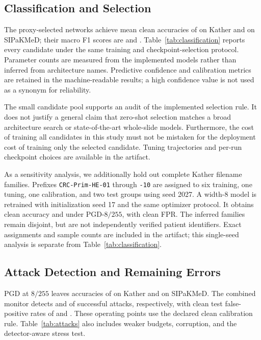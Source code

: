 \documentclass{svproc}
\begin{document}
\subsection{Classification and Selection}

The proxy-selected networks achieve mean clean accuracies of \KAcc{} on Kather and \SAcc{} on SIPaKMeD; their macro F1 scores are \KFone{} and \SFone{}. Table~\ref{tab:classification} reports every candidate under the same training and checkpoint-selection protocol. Parameter counts are measured from the implemented models rather than inferred from architecture names. Predictive confidence and calibration metrics are retained in the machine-readable results; a high confidence value is not used as a synonym for reliability.

The small candidate pool supports an audit of the implemented selection rule. It does not justify a general claim that zero-shot selection matches a broad architecture search or state-of-the-art whole-slide models. Furthermore, the cost of training all candidates in this study must not be mistaken for the deployment cost of training only the selected candidate. Tuning trajectories and per-run checkpoint choices are available in the artifact.

As a sensitivity analysis, we additionally hold out complete Kather filename families. Prefixes \texttt{CRC-Prim-HE-01} through \texttt{-10} are assigned to six training, one tuning, one calibration, and two test groups using seed 2027. A width-8 model is retrained with initialization seed 17 and the same optimizer protocol. It obtains \KSourceAcc{} clean accuracy and \KSourcePGDAcc{} under PGD-$8/255$, with \KSourceFPR{} clean FPR. The inferred families remain disjoint, but are not independently verified patient identifiers. Exact assignments and sample counts are included in the artifact; this single-seed analysis is separate from Table~\ref{tab:classification}.

\subsection{Attack Detection and Remaining Errors}

PGD at $8/255$ leaves accuracies of \KPGDAcc{} on Kather and \SPGDAcc{} on SIPaKMeD. The combined monitor detects \KPGDTPR{} and \SPGDTPR{} of successful attacks, respectively, with clean test false-positive rates of \KPGDFPR{} and \SPGDFPR{}. These operating points use the declared clean calibration rule. Table~\ref{tab:attacks} also includes weaker budgets, corruption, and the detector-aware stress test.
\end{document}

